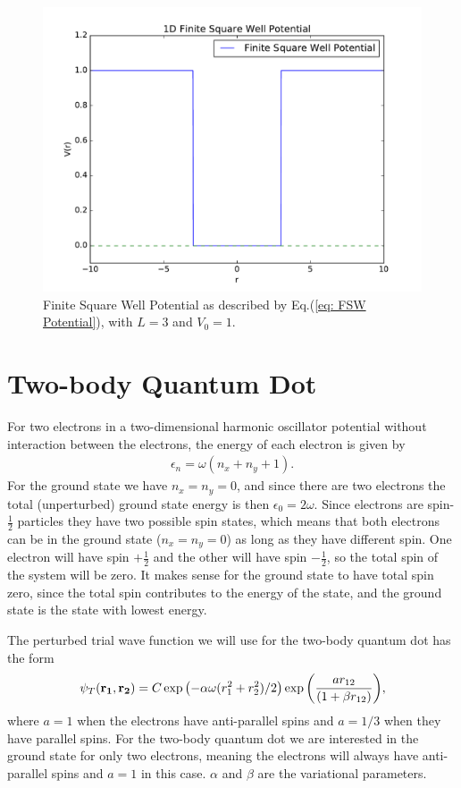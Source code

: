 \documentclass[../main.tex]{subfiles}
\begin{document}
\begin{figure}[!ht]
    \centering
    \includegraphics[scale=0.7]{figures/FSW_Potential}
    \caption{Finite Square Well Potential as described by Eq.(\ref{eq: FSW Potential}), with $L = 3$ and $V_0 = 1$.}
    \label{fig: FSW Potential}
\end{figure}


\section{Two-body Quantum Dot}
For two electrons in a two-dimensional harmonic oscillator potential without interaction between the electrons, the energy of each electron is given by
\begin{align}\label{eq: unperturbedEnergy}
    \epsilon_n = \omega(n_x + n_y + 1).
\end{align}
For the ground state we have $n_x=n_y=0$, and since there are two electrons the total (unperturbed) ground state energy is then $\epsilon_0 = 2\omega$. Since electrons are spin-$\frac{1}{2}$ particles they have two possible spin states, which means that both electrons can be in the ground state ($n_x=n_y=0$) as long as they have different spin. One electron will have spin $+\frac{1}{2}$ and the other will have spin $-\frac{1}{2}$, so the total spin of the system will be zero. It makes sense for the ground state to have total spin zero, since the total spin contributes to the energy of the state, and the ground state is the state with lowest energy.

The perturbed trial wave function we will use for the two-body quantum dot has the form 
\begin{align}
    \psi_{T}({\bf r_1},{\bf r_2}) = 
   C\exp{\left(-\alpha\omega(r_1^2+r_2^2)/2\right)}
   \exp{\left(\frac{ar_{12}}{(1+\beta r_{12})}\right)},
\end{align}
where $a=1$ when the electrons have anti-parallel spins and $a=1/3$ when they have parallel spins. For the two-body quantum dot we are interested in the ground state for only two electrons, meaning the electrons will always have anti-parallel spins and $a=1$ in this case. $\alpha$ and $\beta$ are the variational parameters.
\end{document}
